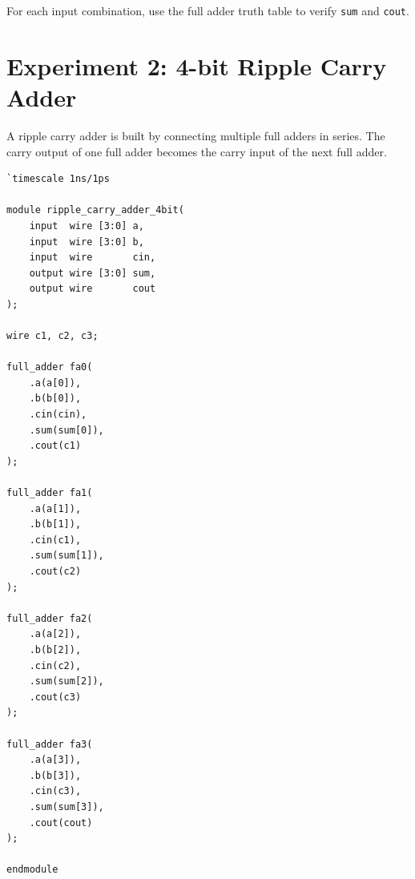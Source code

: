 \documentclass[11pt,a4paper]{article}
\begin{document}
\begin{exercisebox}
For each input combination, use the full adder truth table to verify \texttt{sum} and \texttt{cout}.
\end{exercisebox}

\section{Experiment 2: 4-bit Ripple Carry Adder}

A ripple carry adder is built by connecting multiple full adders in series. The carry output of one full adder becomes the carry input of the next full adder.

\begin{center}
\end{center}

\begin{lstlisting}[caption={4-bit ripple carry adder using full adder modules}]
`timescale 1ns/1ps

module ripple_carry_adder_4bit(
    input  wire [3:0] a,
    input  wire [3:0] b,
    input  wire       cin,
    output wire [3:0] sum,
    output wire       cout
);

wire c1, c2, c3;

full_adder fa0(
    .a(a[0]),
    .b(b[0]),
    .cin(cin),
    .sum(sum[0]),
    .cout(c1)
);

full_adder fa1(
    .a(a[1]),
    .b(b[1]),
    .cin(c1),
    .sum(sum[1]),
    .cout(c2)
);

full_adder fa2(
    .a(a[2]),
    .b(b[2]),
    .cin(c2),
    .sum(sum[2]),
    .cout(c3)
);

full_adder fa3(
    .a(a[3]),
    .b(b[3]),
    .cin(c3),
    .sum(sum[3]),
    .cout(cout)
);

endmodule
\end{lstlisting}
\end{document}
